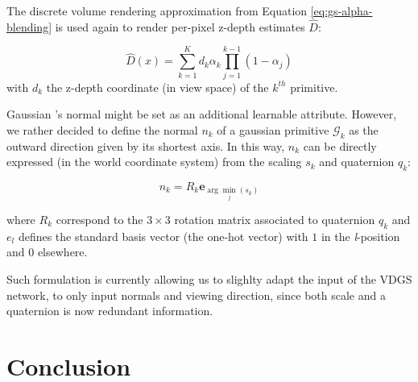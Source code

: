The discrete volume rendering approximation from Equation \eqref{eq:gs-alpha-blending} is used again to render per-pixel z-depth estimates $\hat{D}$:

\begin{equation}
  \hat{D}(x) = \sum_{k=1}^{K}d_{k}\alpha_{k}\prod_{j=1}^{k-1}(1-\alpha_{j})
\end{equation}
with $d_{k}$ the z-depth coordinate (in view space) of the $k^{th}$ primitive. \newline

Gaussian 's normal might be set as an additional learnable attribute. However, we rather decided to define the normal $n_{k}$ of a gaussian primitive $\mathcal{G}_{k}$ as the outward direction given by its shortest axis. In this way, $n_{k}$ can be directly expressed (in the world coordinate system) from the scaling $s_{k}$ and quaternion $q_{k}$: 

\begin{equation}
  n_{k} = R_{k}\mathbf{e}_{\arg\min_{j}(s_k)}
\end{equation}

where $R_{k}$ correspond to the $3\times 3$ rotation matrix associated to quaternion $q_{k}$ and $e_{l}$ defines the standard basis vector (the one-hot vector) with $1$ in the \textit{l}-position and $0$ elsewhere.  

Such formulation is currently allowing us to slighlty adapt the input of the \ac{VDGS} network, to only input normals and viewing direction, since both scale and a quaternion is now redundant information. 


\section{Conclusion}


